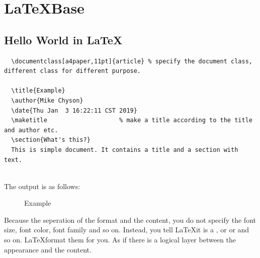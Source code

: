\chapter{\LaTeX Base}
\section{Hello World in \LaTeX}

\lstset{language=TeX}
\begin{lstlisting}
  \documentclass[a4paper,11pt]{article} % specify the document class, different class for different purpose.
  
  \title{Example}
  \author{Mike Chyson}
  \date{Thu Jan  3 16:22:11 CST 2019}
  \maketitle                    % make a title according to the title and author etc.
  \section{What's this?}        
  This is simple document. It contains a title and a section with text.
  
\end{lstlisting}

The output is as follows:
\begin{figure}
  \centering
  \caption{Example}
\end{figure}



Because the seperation of the format and the content, 
you do not specify the font size, font color, font family and so on.
Instead, you tell \LaTeX it is a , or  or  and so on.
\LaTeX format them for you.
As if there is a logical layer between the appearance and the content.


